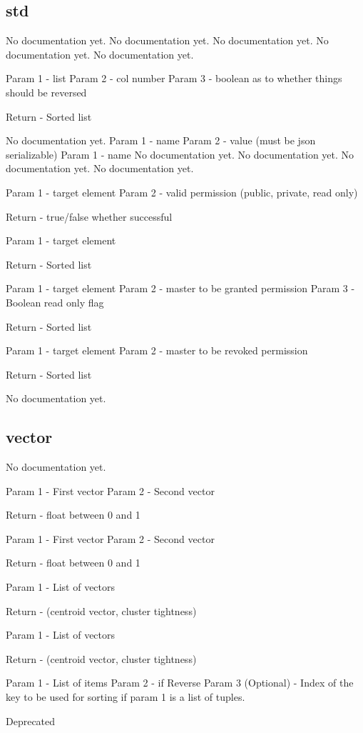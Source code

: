 \subsection{std}
\par
No documentation yet.
{No documentation yet.}
{No documentation yet.}
{No documentation yet.}
{No documentation yet.}
{Param 1 - list
Param 2 - col number
Param 3 - boolean as to whether things should be reversed

Return - Sorted list}
{No documentation yet.}
{Param 1 - name
Param 2 - value (must be json serializable)}
{Param 1 - name}
{No documentation yet.}
{No documentation yet.}
{No documentation yet.}
{No documentation yet.}
{Param 1 - target element
Param 2 - valid permission (public, private, read only)

Return - true/false whether successful}
{Param 1 - target element

Return - Sorted list}
{Param 1 - target element
Param 2 - master to be granted permission
Param 3 - Boolean read only flag

Return - Sorted list}
{Param 1 - target element
Param 2 - master to be revoked permission

Return - Sorted list}
{No documentation yet.}
\subsection{vector}
\par
No documentation yet.
{Param 1 - First vector
Param 2 - Second vector

Return - float between 0 and 1}
{Param 1 - First vector
Param 2 - Second vector

Return - float between 0 and 1}
{Param 1 - List of vectors

Return - (centroid vector, cluster tightness)}
{Param 1 - List of vectors

Return - (centroid vector, cluster tightness)}
{Param 1 - List of items
Param 2 - if Reverse
Param 3 (Optional) - Index of the key to be used for sorting
if param 1 is a list of tuples.

Deprecated}
